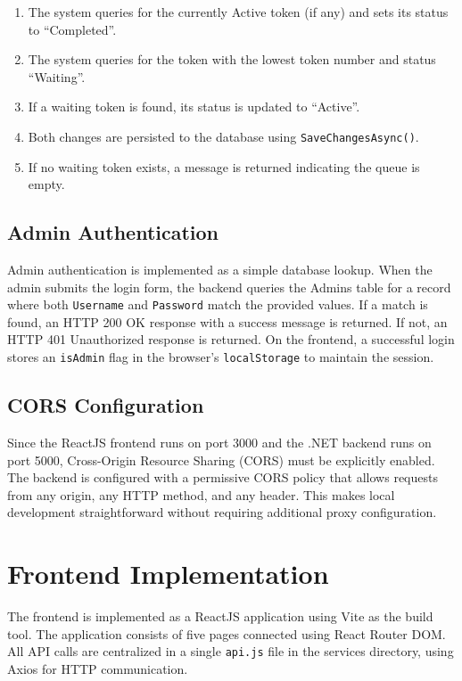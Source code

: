 \begin{enumerate}
    \item The system queries for the currently Active token (if any) and sets its status to ``Completed''.
    \item The system queries for the token with the lowest token number and status ``Waiting''.
    \item If a waiting token is found, its status is updated to ``Active''.
    \item Both changes are persisted to the database using \texttt{SaveChangesAsync()}.
    \item If no waiting token exists, a message is returned indicating the queue is empty.
\end{enumerate}

\subsection{Admin Authentication}

Admin authentication is implemented as a simple database lookup. When the admin submits the login form, the backend queries the Admins table for a record where both \texttt{Username} and \texttt{Password} match the provided values. If a match is found, an HTTP 200 OK response with a success message is returned. If not, an HTTP 401 Unauthorized response is returned. On the frontend, a successful login stores an \texttt{isAdmin} flag in the browser's \texttt{localStorage} to maintain the session.

\subsection{CORS Configuration}

Since the ReactJS frontend runs on port 3000 and the .NET backend runs on port 5000, Cross-Origin Resource Sharing (CORS) must be explicitly enabled. The backend is configured with a permissive CORS policy that allows requests from any origin, any HTTP method, and any header. This makes local development straightforward without requiring additional proxy configuration.

\section{Frontend Implementation}

The frontend is implemented as a ReactJS application using Vite as the build tool. The application consists of five pages connected using React Router DOM. All API calls are centralized in a single \texttt{api.js} file in the services directory, using Axios for HTTP communication.

